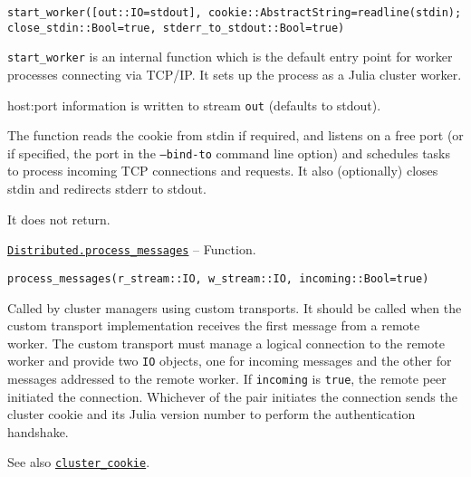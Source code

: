\begin{adjustwidth}{2em}{0pt}


\begin{verbatim}
start_worker([out::IO=stdout], cookie::AbstractString=readline(stdin); close_stdin::Bool=true, stderr_to_stdout::Bool=true)
\end{verbatim}

\texttt{start\_worker} is an internal function which is the default entry point for worker processes connecting via TCP/IP. It sets up the process as a Julia cluster worker.

host:port information is written to stream \texttt{out} (defaults to stdout).

The function reads the cookie from stdin if required, and  listens on a free port (or if specified, the port in the \texttt{--bind-to} command line option) and schedules tasks to process incoming TCP connections and requests. It also (optionally) closes stdin and redirects stderr to stdout.

It does not return.



\end{adjustwidth}
\hypertarget{3971171154765725829}{} 
\hyperlink{3971171154765725829}{\texttt{Distributed.process\_messages}}  -- {Function.}

\begin{adjustwidth}{2em}{0pt}


\begin{verbatim}
process_messages(r_stream::IO, w_stream::IO, incoming::Bool=true)
\end{verbatim}

Called by cluster managers using custom transports. It should be called when the custom transport implementation receives the first message from a remote worker. The custom transport must manage a logical connection to the remote worker and provide two \texttt{IO} objects, one for incoming messages and the other for messages addressed to the remote worker. If \texttt{incoming} is \texttt{true}, the remote peer initiated the connection. Whichever of the pair initiates the connection sends the cluster cookie and its Julia version number to perform the authentication handshake.

See also \hyperlink{914110747490695974}{\texttt{cluster\_cookie}}.



\end{adjustwidth}

\hypertarget{12143077483043952829}{}


